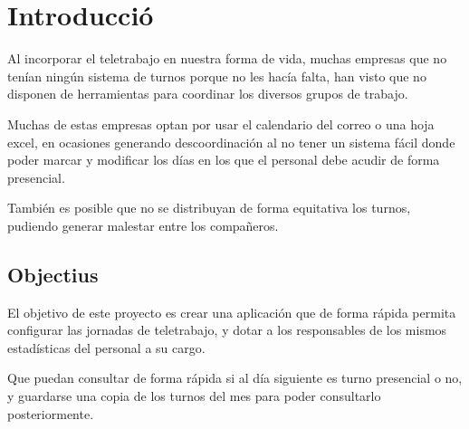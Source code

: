 \documentclass[11pt,spanish,listoffigures,listoftables]{tfgetsinf}
\begin{document}

\mainmatter


\chapter{Introducci\'o}

Al incorporar el teletrabajo en nuestra forma de vida, muchas empresas que no tenían ningún sistema de turnos porque no les hacía falta, han visto que no disponen de herramientas para coordinar los diversos grupos de trabajo.

Muchas de estas empresas optan por usar el calendario del correo o  una hoja excel, en ocasiones generando descoordinación al no tener un sistema fácil donde poder marcar y modificar los días en los que el personal debe acudir de forma presencial.

También es posible que no se distribuyan de forma equitativa los turnos, pudiendo generar malestar entre los compañeros.

%
%
\section{Objectius}

El objetivo de este proyecto es crear una aplicación que de forma rápida permita configurar las jornadas de teletrabajo, y dotar a los responsables de los mismos estadísticas del personal a su cargo.

Que puedan consultar de forma rápida si al día siguiente es turno presencial o no, y guardarse una copia de los turnos del mes para poder consultarlo posteriormente. 


\end{document}
